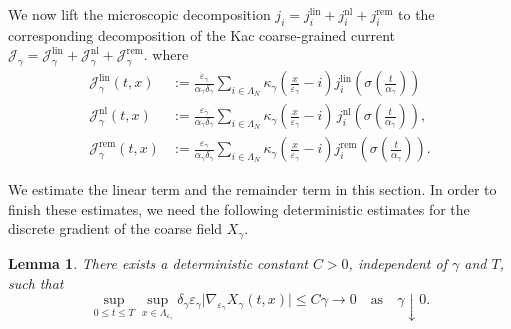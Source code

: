 \documentclass{article}
\newtheorem{lemma}{Lemma}
\begin{document}
We now lift the microscopic decomposition
\(
j_i =j_i^{\mathrm{lin}}+j_i^{\mathrm{nl}}+j_i^{\mathrm{rem}}
\)
to the corresponding decomposition of the Kac coarse-grained current \(
\mathcal J_\gamma
=
\mathcal J_\gamma^{\mathrm{lin}}
+
\mathcal J_\gamma^{\mathrm{nl}}
+
\mathcal J_\gamma^{\mathrm{rem}}.
\)
where
\begin{align}
\label{eq:cg-lin-leading}
\mathcal J_\gamma^{\mathrm{lin}}(t,x)
& :=
\frac{\varepsilon_\gamma}{\alpha_\gamma\delta_\gamma} \sum_{i\in\Lambda_N} \kappa_\gamma\!\left(\frac{x}{\varepsilon_\gamma}-i\right)j_i^{\mathrm{lin}}\left(\sigma\!\left(\frac{t}{\alpha_\gamma}\right)\right)
\\
\label{eq:cg-nl-leading}
\mathcal J_\gamma^{\mathrm{nl}}(t,x)
 & := \frac{\varepsilon_\gamma}{\alpha_\gamma\delta_\gamma} \sum_{i\in\Lambda_N} \kappa_\gamma\!\left(\frac{x}{\varepsilon_\gamma}-i\right)
\,j_i^{\mathrm{nl}}\left(\sigma\!\left(\frac{t}{\alpha_\gamma}\right)\right),
\\
\label{eq:cg-rem-leading}
\mathcal J_\gamma^{\mathrm{rem}}(t,x)
&:= \frac{\varepsilon_\gamma}{\alpha_\gamma\delta_\gamma}\sum_{i\in\Lambda_N} \kappa_\gamma\!\left(\frac{x}{\varepsilon_\gamma}-i\right)j_{i}^{\mathrm{rem}}\left(\sigma\!\left(\frac{t}{\alpha_\gamma}\right)\right).
\end{align}



We estimate the linear term and the remainder term in this section.
In order to finish these estimates, we need the following deterministic estimates for the discrete gradient of the coarse field $X_{\gamma}$.

\begin{lemma}\label{lem:eta-gamma-to-zero}
There exists a deterministic constant \(C>0\), independent of \(\gamma\) and \(T\),
such that
\begin{equation}\label{E:gardX:inf}
    \sup_{0\le t\le T}\sup_{x\in\Lambda_{\varepsilon_\gamma}}
\delta_\gamma\varepsilon_\gamma
\bigl| \nabla_{\varepsilon_\gamma}X_\gamma(t,x)
\bigr| \le C\gamma \rightarrow 0
\quad\text{as} \quad \gamma\downarrow0.
\end{equation}
\end{lemma}
\end{document}
